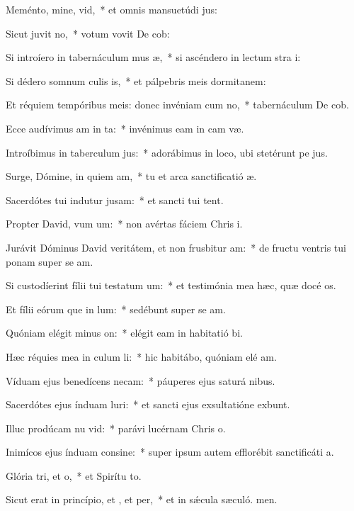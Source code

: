 \item Meménto, mine, vid,~* et omnis mansuetúdi jus:
\item Sicut juvit no,~* votum vovit De cob:
\item Si introíero in tabernáculum mus æ,~* si ascéndero in lectum stra i:
\item Si dédero somnum culis is,~* et pálpebris meis dormitanem:
\item Et réquiem tempóribus meis: donec invéniam cum no,~* tabernáculum De cob.
\item Ecce audívimus am in ta:~* invénimus eam in cam væ.
\item Introíbimus in taberculum jus:~* adorábimus in loco, ubi stetérunt pe jus.
\item Surge, Dómine, in quiem am,~* tu et arca sanctificatió æ.
\item Sacerdótes tui indutur jusam:~* et sancti tui tent.
\item Propter David, vum um:~* non avértas fáciem Chris i.
\item Jurávit Dóminus David veritátem, et non frusbitur am:~* de fructu ventris tui ponam super se am.
\item Si custodíerint fílii tui testatum um:~* et testimónia mea hæc, quæ docé os.
\item Et fílii eórum que in lum:~* sedébunt super se am.
\item Quóniam elégit minus on:~* elégit eam in habitatió bi.
\item Hæc réquies mea in culum li:~* hic habitábo, quóniam elé am.
\item Víduam ejus benedícens necam:~* páuperes ejus saturá nibus.
\item Sacerdótes ejus índuam luri:~* et sancti ejus exsultatióne exbunt.
\item Illuc prodúcam nu vid:~* parávi lucérnam Chris o.
\item Inimícos ejus índuam consine:~* super ipsum autem efflorébit sanctificáti a.
\item Glória tri, et o,~* et Spirítu to.
\item Sicut erat in princípio, et , et per,~* et in sǽcula sæculó. men.
